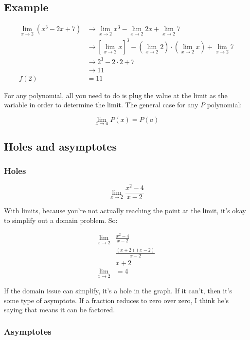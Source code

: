 \documentclass{article}
\begin{document}
\subsection{Example}

\begin{align*}
    \lim_{x \to 2} (x^3 - 2x + 7) &\rightarrow \lim_{x \to 2} x^3 - \lim_{x \to 2} 2x +
\lim_{x\to 2} 7\\
                                  &\rightarrow \left[ \lim_{x \to 2} x \right]^3 - \left(
                                  \lim_{x\to 2} 2\right) \cdot \left( \lim_{x\to 2} x
                              \right) + \lim_{x\to 2} 7\\
                                  & \rightarrow 2^3 - 2 \cdot 2 + 7\\
                                  & \rightarrow 11\\
    f(2) &= 11
\end{align*}

For any polynomial, all you need to do is plug the value at the limit as the variable in
order to determine the limit. The general case for any $P$ polynomial:

$$
\lim_{x \to a}P(x) = P(a)
$$

\subsection{Holes and asymptotes}

\subsubsection{Holes}
$$
\lim_{x\to 2} \frac{x^2 - 4}{x-2}
$$

With limits, because you're not actually reaching the point at the limit, it's okay to
simplify out a domain problem. So:

\begin{align*}
    \lim_{x\to 2} &\frac{x^2 -4}{x-2}\\
                  & \frac{(x+2)(x-2)}{x-2}\\
                  & x+2\\
    \lim_{x\to 2} &= 4
\end{align*}

If the domain issue can simplify, it's a hole in the graph. If it can't, then it's some
type of asymptote. If a fraction reduces to zero over zero, I think he's saying that means
it can be factored.

\subsubsection{Asymptotes}
\end{document}
